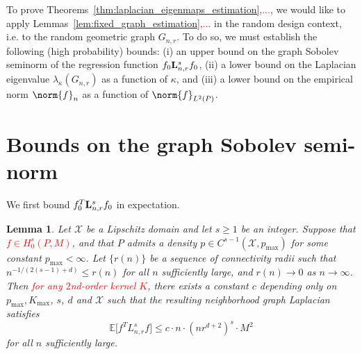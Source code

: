 \documentclass{article}
\newcommand{\1}{\mathbf{1}}
\newcommand{\Lap}{{\bf L}}
\newcommand{\Xset}{\mathcal{X}}
\newcommand{\Ebb}{\mathbb{E}}
\theoremstyle{alden}
\theoremstyle{aldenthm}
\newtheorem{lemma}{Lemma}
\theoremstyle{definition}
\theoremstyle{remark}
\begin{document}
\clearpage
To prove Theorems~\ref{thm:laplacian_eigenmaps_estimation},\textcolor{red}{...}, we would like to apply Lemmas~\ref{lem:fixed_graph_estimation},\textcolor{red}{...} in the random design context, i.e. to the random geometric graph $G_{n,r}$. To do so, we must establish the following (high probability) bounds: (i) an upper bound on the graph Sobolev seminorm of the regression function $f_0 \Lap_{n,r}^s f_0$, (ii) a lower bound on the Laplacian eigenvalue $\lambda_{\kappa}(G_{n,r})$ as a function of $\kappa$, and (iii) a lower bound on the empirical norm $\norm{f}_{n}$ as a function of $\norm{f}_{L^2(P)}$. 

\section{Bounds on the graph Sobolev semi-norm}
\label{sec:graph_sobolev_seminorm}
We first bound $f_0^T \Lap_{n,r}^s f_0$ in expectation.
\begin{lemma}
	\label{lem:roughness_functional_expectation_sobolev}
	Let $\Xset$ be a Lipschitz domain and let $s \geq 1$ be an integer. Suppose that \textcolor{red}{$f \in H_0^{s}(P,M)$}, and that $P$ admits a density $p \in C^{s-1}(\Xset,p_{\max})$ for some constant $p_{\max} < \infty$. Let $\{r(n)\}$ be a sequence of connectivity radii such that $n^{-1/(2(s - 1) + d)} \leq r(n)$ for all $n$ sufficiently large, and $r(n) \to 0$ as $n \to \infty$. Then \textcolor{red}{for any $2$nd-order kernel $K$}, there exists a constant $c$ depending only on $p_{\max}, K_{\max}$, $s$, $d$ and $\Xset$ such that the resulting neighborhood graph Laplacian satisfies
	\begin{equation}
	\label{eqn:roughness_functional_expectation_sobolev}
	\Ebb\bigl[f^T L_{n,r}^s f\bigr] \leq c \cdot n \cdot (nr^{d+2})^s \cdot M^2
	\end{equation}
	for all $n$ sufficiently large.
\end{lemma}
\end{document}
